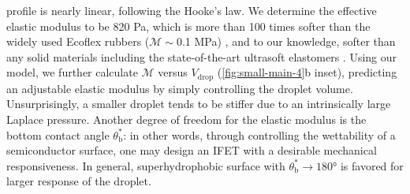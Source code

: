   \varepsilon\) profile is nearly linear, following the Hooke's law. We
determine the effective elastic modulus to be 820 Pa, which is more
than 100 times softer than the widely used Ecoflex rubbers
(\(\mathscr{M}\sim{}\)0.1 MPa) \autocite{Mosadegh_2014_soft_robot}, and to our knowledge, softer than any solid
materials including the state-of-the-art ultrasoft elastomers
\autocite{Miriyev_2017_soft_mater,Jang_2015_soft_network}.
%
Using our model, we further calculate \(\mathscr{M}\) versus
\(V_{\mathrm{drop}}\) (\autoref{fig:small-main-4}b inset), predicting
an adjustable elastic modulus by simply controlling the droplet
volume. Unsurprisingly, a smaller droplet tends to be stiffer due to
an intrinsically large Laplace pressure. Another degree of freedom for
the elastic modulus is the bottom contact angle
$\theta_{\mathrm{b}}^{*}$: in other words, through controlling the
wettability of a semiconductor surface, one may design an IFET with a
desirable mechanical responsiveness. In general, superhydrophobic
surface with $\theta_{\mathrm{b}}^{*} \to 180°$ is favored for larger
response of the droplet.

